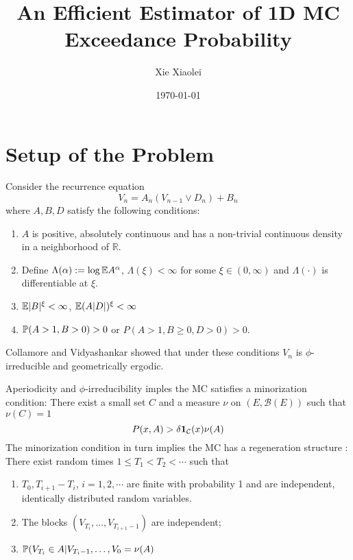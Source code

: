 \documentclass{beamer}
\title{An Efficient Estimator of 1D MC Exceedance Probability} %
\author{Xie Xiaolei} %
\institute[UCPH] %
{
Copenhagen University  \\ %
\medskip
\textit{hnq365@math.ku.dk} %
}
\date{\today} %
\begin{document}
\begin{frame}
\titlepage %
\end{frame}


\section{Setup of the Problem}
\begin{frame}
  Consider the recurrence equation 
  \[
  V_n = A_n (V_{n-1} \vee D_n) + B_n
  \]
  where $A, B, D$ satisfy the following conditions:
  \begin{enumerate}
  \item $A$ is positive, absolutely continuous and has a non-trivial continuous density in
    a neighborhood of $\mathbb R$.
  \item Define $\Lambda(\alpha) := \log \E A^\alpha$, $\Lambda(\xi) < \infty$ for some $\xi \in (0,
    \infty)$ and $\Lambda(\cdot)$ is differentiable at $\xi$.
  \item $\E |B|^\xi < \infty$, $\E (A|D|)^\xi < \infty$
  \item $\P(A > 1, B > 0) > 0$ or $P(A > 1, B \geq 0, D > 0) > 0$.
  \end{enumerate}
  Collamore and Vidyashankar showed \cite{Collamore20133378} that
  under these conditions $V_n$ is $\phi$-irreducible and geometrically
  ergodic.
\end{frame}

\begin{frame}
  Aperiodicity and $\phi$-irreducibility imples the MC satisfies a
  minorization condition: There exist a small set $C$ and a measure
  $\nu$ on $(E, \mathcal B(E))$ such that $\nu(C) = 1$
  \[
  P(x, A) > \delta \I{\mathcal C}(x) \nu(A)
  \]
  The minorization condition in turn implies the MC has a regeneration
  structure \cite{Nummelin1978}: There exist random times $1 \leq T_1
  < T_2 < \cdots$ such that
  \begin{enumerate}
  \item $T_0, T_{i+1} - T_{i}$, $i = 1, 2, \cdots$ are finite with
    probability 1 and are independent, identically distributed random
    variables.
  \item The blocks $(V_{T_i}, \dots, V_{T_{i+1} - 1})$ are independent;
  \item $\P(V_{T_i} \in A | V_{T_{i}-1}, \dots, V_0 = \nu(A)$
  \end{enumerate}
\end{frame}
\end{document}
